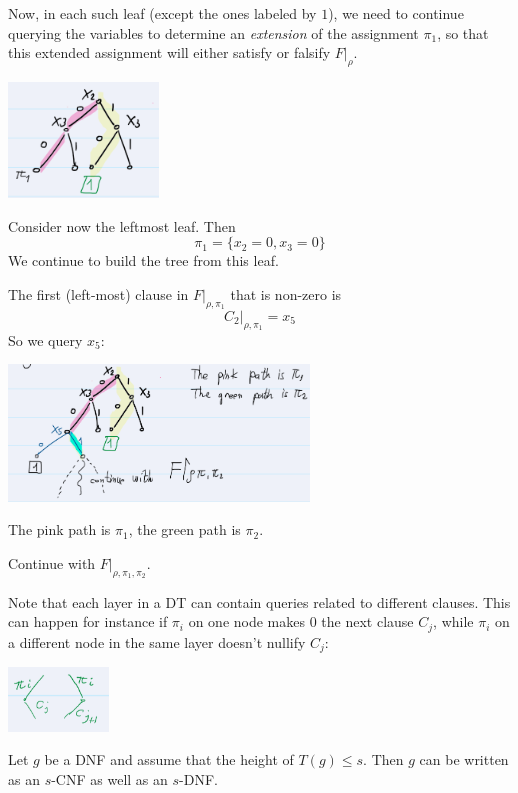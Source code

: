\noindent
Now, in each such leaf (except the ones labeled by \( 1 \)), we need to continue querying the variables to determine an \textit{extension} of the assignment \( \pi_1 \), so that this extended assignment will either satisfy or falsify \( F|_{\rho} \).


\includegraphics[width=0.3\textwidth]{images/ex3-sl-dt.png}
\noindent

Consider now the leftmost leaf. Then
\[
\pi_1 = \{ x_2 = 0, x_3 = 0 \}
\]
We continue to build the tree from this leaf.

\noindent
The first (left-most) clause in \( F|_{\rho, \pi_1} \) that is non-zero is
\[
C_2|_{\rho, \pi_1} = x_5
\]
So we query \( x_5 \):

\noindent
\includegraphics[width=0.6\textwidth]{images/ex4-sl-dt.png}
\noindent

The pink path is \( \pi_1 \), the green path is \( \pi_2 \).

\noindent
Continue with \( F|_{\rho, \pi_1, \pi_2} \).

\noindent
Note that each layer in a DT can contain queries related to different clauses.
This can happen for instance if \( \pi_i \) on one node makes 0 the next clause \( C_j \), 
while \( \pi_i \) on a different node in the same layer doesn't nullify \( C_j \):
 
\includegraphics[width=0.2\textwidth]{images/ex5-sl-dt.png}
\begin{claim}
Let \( g \) be a DNF and assume that the height of \( T(g) \leq s \).
Then \( g \) can be written as an \( s \)-CNF as well as an \( s \)-DNF.
\end{claim}

